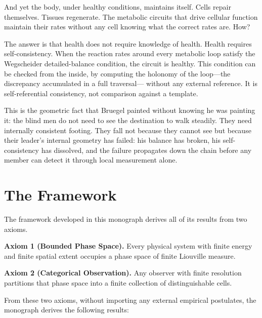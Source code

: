And yet the body, under healthy conditions, maintains itself.  Cells
repair themselves.  Tissues regenerate.  The metabolic circuits that drive
cellular function maintain their rates without any cell knowing what the
correct rates are.  How?

The answer is that health does not require knowledge of health.  Health
requires self-consistency.  When the reaction rates around every metabolic
loop satisfy the Wegscheider detailed-balance condition, the circuit is
healthy.  This condition can be checked from the inside, by computing the
holonomy of the loop---the discrepancy accumulated in a full traversal---
without any external reference.  It is self-referential consistency, not
comparison against a template.

This is the geometric fact that Bruegel painted without knowing he was
painting it: the blind men do not need to see the destination to walk
steadily.  They need internally consistent footing.  They fall not because
they cannot see but because their leader's internal geometry has failed:
his balance has broken, his self-consistency has dissolved, and the failure
propagates down the chain before any member can detect it through local
measurement alone.

\section*{The Framework}

The framework developed in this monograph derives all of its results from
two axioms.

\textbf{Axiom 1 (Bounded Phase Space).}  Every physical system with finite
energy and finite spatial extent occupies a phase space of finite Liouville
measure.

\textbf{Axiom 2 (Categorical Observation).}  Any observer with finite
resolution partitions that phase space into a finite collection of
distinguishable cells.

From these two axioms, without importing any external empirical postulates,
the monograph derives the following results:


